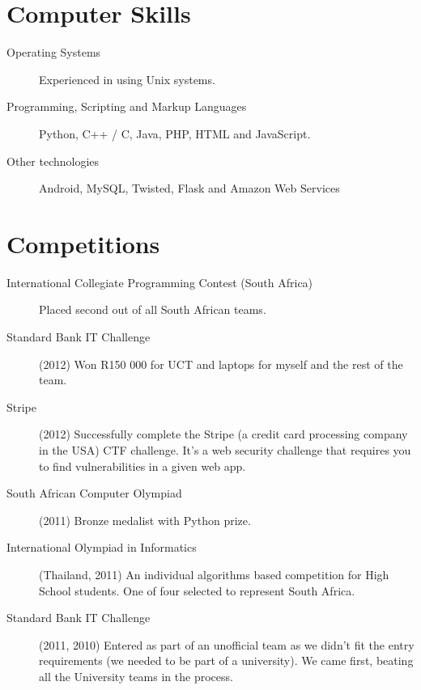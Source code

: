 \documentclass[margin,line,a4paper]{resume}
\begin{document}
\begin{resume}
        \section{\mysidestyle Computer Skills}
            \begin{description}
                \item [Operating Systems] Experienced in using Unix systems.

                \item [Programming, Scripting and Markup Languages] Python, C++ / C, Java, PHP, HTML and JavaScript.

                \item [Other technologies] Android, MySQL, Twisted, Flask and Amazon Web Services
            \end{description}

        \section{\mysidestyle Competitions}
            \begin{description}
                \item [International Collegiate Programming Contest (South Africa)] Placed second out of all South African teams.
                \item [Standard Bank IT Challenge] (2012) Won R150 000 for UCT and laptops for myself and the rest of the team.
                \item [Stripe] (2012) Successfully complete the Stripe (a credit card processing company in the USA) CTF challenge. 
                    It's a web security challenge that requires you to find vulnerabilities in a given web app.

                \item [South African Computer Olympiad] (2011) Bronze medalist with Python prize.

                \item [International Olympiad in Informatics] (Thailand, 2011) An individual 
                algorithms based competition for High School students. One of four selected
                to represent South Africa.

                \item [Standard Bank IT Challenge] (2011, 2010) Entered as part of an unofficial team
                as we didn't fit the entry requirements (we needed to be part of a university).
                We came first, beating all the University teams in the process.


\end{description}
\end{resume}
\end{document}
